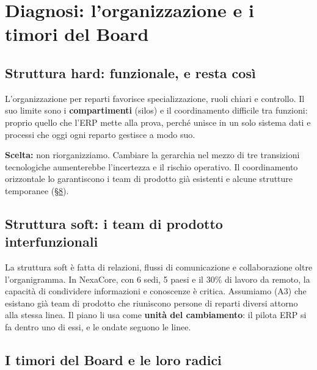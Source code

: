 \documentclass[11pt,a4paper]{article}
\begin{document}
\section{Diagnosi: l'organizzazione e i timori del Board}\label{sec:4}

\subsection{Struttura hard: funzionale, e resta così}\label{sec:4.1}
L'organizzazione per reparti favorisce specializzazione, ruoli chiari e controllo. Il suo limite sono i \textbf{compartimenti} (silos) e il coordinamento difficile tra funzioni: proprio quello che l'ERP mette alla prova, perché unisce in un solo sistema dati e processi che oggi ogni reparto gestisce a modo suo.

\textbf{Scelta:} non riorganizziamo. Cambiare la gerarchia nel mezzo di tre transizioni tecnologiche aumenterebbe l'incertezza e il rischio operativo. Il coordinamento orizzontale lo garantiscono i team di prodotto già esistenti e alcune strutture temporanee (\hyperref[sec:8]{\S8}).

\subsection{Struttura soft: i team di prodotto interfunzionali}\label{sec:4.2}
La struttura soft è fatta di relazioni, flussi di comunicazione e collaborazione oltre l'organigramma. In NexaCore, con 6 sedi, 5 paesi e il 30\% di lavoro da remoto, la capacità di condividere informazioni e conoscenze è critica. Assumiamo (A3) che esistano già team di prodotto che riuniscono persone di reparti diversi attorno alla stessa linea. Il piano li usa come \textbf{unità del cambiamento}: il pilota ERP si fa dentro uno di essi, e le ondate seguono le linee.

\subsection{I timori del Board e le loro radici}\label{sec:4.3}
\end{document}

